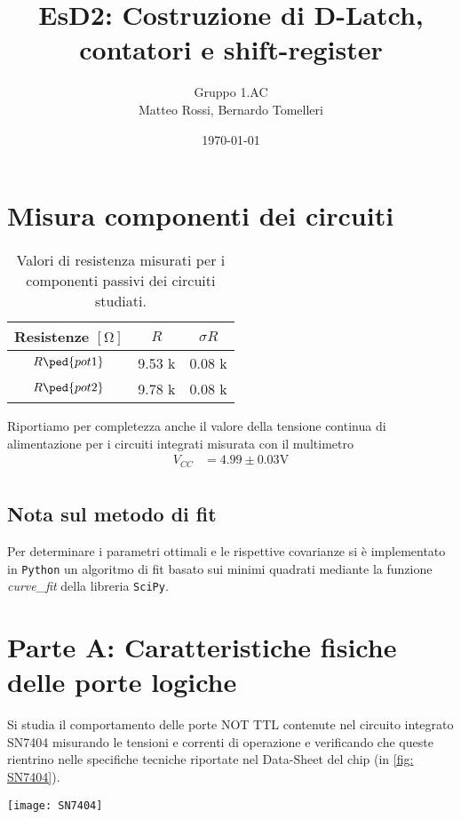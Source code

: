 \documentclass[10pt, a4paper, italian]{article}
\author{Gruppo 1.AC \\ Matteo Rossi, Bernardo Tomelleri}
\title{EsD2: Costruzione di D-Latch, contatori e shift-register}
\begin{document}
\date{\today}
\maketitle

\section*{Misura componenti dei circuiti}
\begin{table}[htbp]
\centering
\begin{tabular}{ccc}
\toprule
Resistenze $[\si{\ohm}]$ & $R$ & $\sigma R$ \\
\midrule
\midrule
$R\ped{pot1}$	& 9.53 k	& 0.08 k 		\\
$R\ped{pot2}$	& 9.78 k	& 0.08 k 		\\

\bottomrule     
\end{tabular}
\caption{Valori di resistenza misurati per i componenti passivi dei circuiti
studiati. \label{tab: rmesM}}
\end{table}

Riportiamo per completezza anche il valore della tensione continua di
alimentazione per i circuiti integrati misurata con il multimetro
\begin{align*}
V_{CC} &= 4.99 \pm 0.03 \si{\V} \\
\end{align*}

\subsection*{Nota sul metodo di fit}
Per determinare i parametri ottimali e le rispettive covarianze si \`e
implementato in \verb+Python+ un algoritmo di fit basato sui minimi quadrati
mediante la funzione \emph{curve\_fit} della libreria \texttt{SciPy}.

\setcounter{section}{0}
\section*{Parte A: Caratteristiche fisiche delle porte logiche}
Si studia il comportamento delle porte NOT TTL contenute nel circuito integrato
SN7404 misurando le tensioni e correnti di operazione e verificando che queste
rientrino nelle specifiche tecniche riportate nel Data-Sheet del chip
(in \cref{fig: SN7404}).
\begin{minipage}{0.3\textwidth}
    \texttt{[image: SN7404]}
    \label{fig: SN7404}
\end{minipage}
\end{document}
